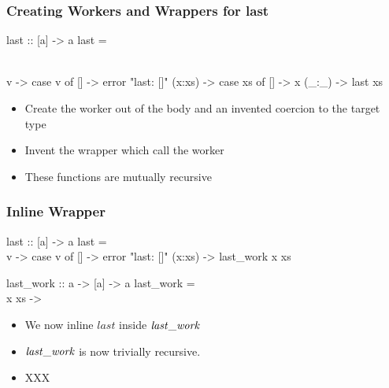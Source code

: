 \documentclass[smaller]{beamer}
\newcommand{\Varid}[1]{\mathit{#1}}
\begin{document}
\begin{frame}[fragile]
\frametitle{Creating Workers and Wrappers for last}

\begin{semiverbatim}
last :: [a] -> a
\alert<4>{last} = 

\\ v -> case v of
                  []     -> error "last: []"
                  (x:xs) -> case xs of
                             []    -> x
                             (_:_) -> \alert<4>{last} xs



\end{semiverbatim}
\begin{itemize}
\item <2- |alert@2>Create the worker out of the body and an invented coercion to the target type
\item <3- |alert@3>Invent the wrapper which call the worker
\item <4- |alert@4>These functions are mutually recursive
\end{itemize}
\end{frame}

\begin{frame}[fragile]
\frametitle{Inline Wrapper}
\begin{semiverbatim}
last :: [a] -> a
last = \\ v -> case v of
                []     -> error "last: []"
                (x:xs) -> last_work x xs

last_work :: a -> [a] -> a
last_work = \\ x xs -> \end{semiverbatim}
\begin{itemize}
\item<1- |alert@1>We now inline \ensuremath{\Varid{last}} inside \ensuremath{\Varid{last\char95 work}}
\item<2- |alert@2>\ensuremath{\Varid{last\char95 work}} is now trivially recursive.
\item<0>XXX
\end{itemize}
\end{frame}
\end{document}
